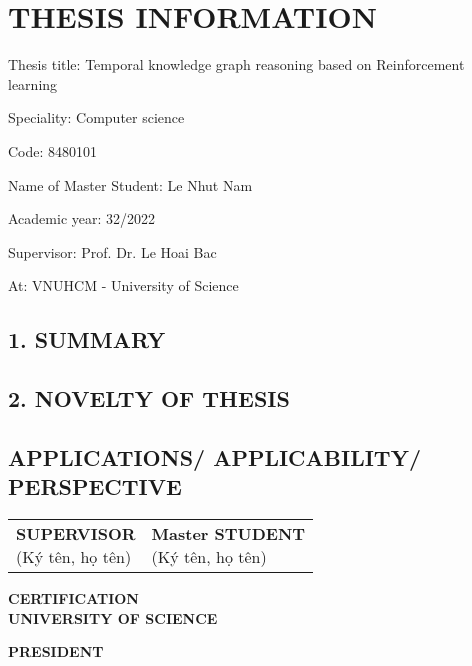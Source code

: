 \chapter*{THESIS INFORMATION}

\begin{flushleft}
Thesis title: Temporal knowledge graph reasoning based on Reinforcement learning

Speciality: Computer science

Code: 8480101

Name of Master Student: Le Nhut Nam

Academic year: 32/2022

Supervisor: Prof. Dr. Le Hoai Bac

At: VNUHCM - University of Science
\end{flushleft}

\section*{1. SUMMARY}
\lipsum[1-2]

\section*{2. NOVELTY OF THESIS}
\lipsum[1-2]

\section*{APPLICATIONS/ APPLICABILITY/ PERSPECTIVE}
\lipsum[1-2]

\vspace{4\baselineskip}
\begin{table}[H]
\begin{adjustbox}{max width =\textwidth}
\begin{tabular}{p{8.44cm}p{8.4cm}}
\multicolumn{1}{p{8.44cm}}{
\centering \textbf{SUPERVISOR} \newline
\centering
(Ký tên, họ tên) \newline
} &
\multicolumn{1}{p{8.4cm}}{
\centering \textbf{Master STUDENT} \newline
\centering
(Ký tên, họ tên) \newline
} \\
\end{tabular}
\end{adjustbox}
\end{table}
\vspace{2\baselineskip}
\begin{center}
    \textbf{CERTIFICATION \\ UNIVERSITY OF SCIENCE}
\end{center}
\begin{center}
    \textbf{PRESIDENT}
\end{center}
